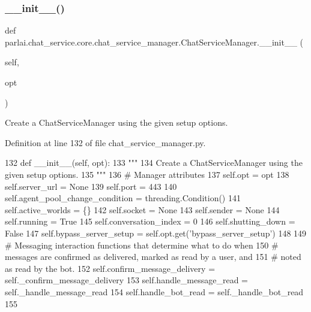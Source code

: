 \subsubsection{\texorpdfstring{\+\_\+\+\_\+init\+\_\+\+\_\+()}{\_\_init\_\_()}}
{\footnotesize\ttfamily def parlai.\+chat\+\_\+service.\+core.\+chat\+\_\+service\+\_\+manager.\+Chat\+Service\+Manager.\+\_\+\+\_\+init\+\_\+\+\_\+ (\begin{DoxyParamCaption}\item[{}]{self,  }\item[{}]{opt }\end{DoxyParamCaption})}

\begin{DoxyVerb}Create a ChatServiceManager using the given setup options.
\end{DoxyVerb}
 

Definition at line 132 of file chat\+\_\+service\+\_\+manager.\+py.


\begin{DoxyCode}
132     \textcolor{keyword}{def }\_\_init\_\_(self, opt):
133         \textcolor{stringliteral}{"""}
134 \textcolor{stringliteral}{        Create a ChatServiceManager using the given setup options.}
135 \textcolor{stringliteral}{        """}
136         \textcolor{comment}{# Manager attributes}
137         self.opt = opt
138         self.server\_url = \textcolor{keywordtype}{None}
139         self.port = 443
140         self.agent\_pool\_change\_condition = threading.Condition()
141         self.active\_worlds = \{\}
142         self.socket = \textcolor{keywordtype}{None}
143         self.sender = \textcolor{keywordtype}{None}
144         self.running = \textcolor{keyword}{True}
145         self.conversation\_index = 0
146         self.shutting\_down = \textcolor{keyword}{False}
147         self.bypass\_server\_setup = self.opt.get(\textcolor{stringliteral}{'bypass\_server\_setup'})
148 
149         \textcolor{comment}{# Messaging interaction functions that determine what to do when}
150         \textcolor{comment}{# messages are confirmed as delivered, marked as read by a user, and}
151         \textcolor{comment}{# noted as read by the bot.}
152         self.confirm\_message\_delivery = self.\_confirm\_message\_delivery
153         self.handle\_message\_read = self.\_handle\_message\_read
154         self.handle\_bot\_read = self.\_handle\_bot\_read
155 
\end{DoxyCode}



